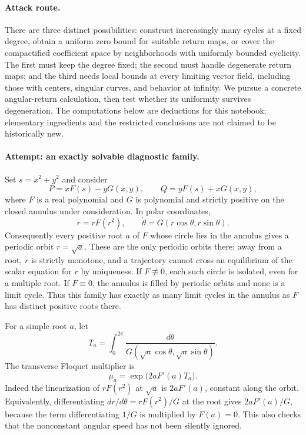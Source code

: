 \documentclass[11pt,a4paper]{article}
\numberwithin{equation}{section}
\begin{document}
\paragraph{Attack route.}
There are three distinct possibilities: construct increasingly many cycles
at a fixed degree, obtain a uniform zero bound for suitable return maps,
or cover the compactified coefficient space by neighborhoods with uniformly
bounded cyclicity. The first must keep the degree fixed; the second must
handle degenerate return maps; and the third needs local bounds at every
limiting vector field, including those with centers, singular curves, and
behavior at infinity. We pursue a concrete angular-return calculation,
then test whether its uniformity survives degeneration. The computations
below are deductions for this notebook; elementary ingredients and the
restricted conclusions are not claimed to be historically new.

\paragraph{Attempt: an exactly solvable diagnostic family.}
Set $s=x^2+y^2$ and consider
\[
 P=xF(s)-yG(x,y),\qquad Q=yF(s)+xG(x,y),
 \tag{40.1}
\]
where $F$ is a real polynomial and $G$ is polynomial and strictly positive
on the closed annulus under consideration. In polar coordinates,
\[
 \dot r=rF(r^2),\qquad \dot\theta=G(r\cos\theta,r\sin\theta).
 \tag{40.2}
\]
Consequently every positive root $a$ of $F$ whose circle lies in the
annulus gives a periodic orbit $r=\sqrt a$. These are the only periodic
orbits there: away from a root, $r$ is strictly monotone, and a trajectory
cannot cross an equilibrium of the scalar equation for $r$ by uniqueness.
If $F\not\equiv0$, each such circle is isolated, even for a multiple root.
If $F\equiv0$, the annulus is filled by periodic orbits and none is a limit
cycle. Thus this family has exactly as many limit cycles in the annulus
as $F$ has distinct positive roots there.

For a simple root $a$, let
\[
 T_a=\int_0^{2\pi}\frac{d\theta}
 {G(\sqrt a\cos\theta,\sqrt a\sin\theta)}.
\]
The transverse Floquet multiplier is
\[
 \mu_a=\exp\bigl(2aF'(a)T_a\bigr).                 \tag{40.3}
\]
Indeed the linearization of $rF(r^2)$ at $\sqrt a$ is
$2aF'(a)$, constant along the orbit. Equivalently, differentiating
$dr/d\theta=rF(r^2)/G$ at the root gives
$2aF'(a)/G$, because the term differentiating $1/G$ is multiplied by
$F(a)=0$. This also checks that the nonconstant angular speed has not been
silently ignored.
\end{document}
